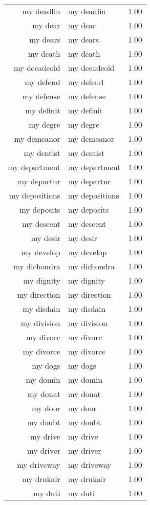 \begin{table}[ht]
\begin{tabular}{rlr}
  my deadlin & my deadlin & 1.00 \\ 
  my dear & my dear & 1.00 \\ 
  my dears & my dears & 1.00 \\ 
  my death & my death & 1.00 \\ 
  my decadeold & my decadeold & 1.00 \\ 
  my defend & my defend & 1.00 \\ 
  my defense & my defense & 1.00 \\ 
  my definit & my definit & 1.00 \\ 
  my degre & my degre & 1.00 \\ 
  my demeanor & my demeanor & 1.00 \\ 
  my dentist & my dentist & 1.00 \\ 
  my department & my department & 1.00 \\ 
  my departur & my departur & 1.00 \\ 
  my depositions & my depositions & 1.00 \\ 
  my deposits & my deposits & 1.00 \\ 
  my descent & my descent & 1.00 \\ 
  my desir & my desir & 1.00 \\ 
  my develop & my develop & 1.00 \\ 
  my dichondra & my dichondra & 1.00 \\ 
  my dignity & my dignity & 1.00 \\ 
  my direction & my direction & 1.00 \\ 
  my disdain & my disdain & 1.00 \\ 
  my division & my division & 1.00 \\ 
  my divorc & my divorc & 1.00 \\ 
  my divorce & my divorce & 1.00 \\ 
  my dogs & my dogs & 1.00 \\ 
  my domin & my domin & 1.00 \\ 
  my donat & my donat & 1.00 \\ 
  my door & my door & 1.00 \\ 
  my doubt & my doubt & 1.00 \\ 
  my drive & my drive & 1.00 \\ 
  my driver & my driver & 1.00 \\ 
  my driveway & my driveway & 1.00 \\ 
  my drukair & my drukair & 1.00 \\ 
  my duti & my duti & 1.00 \\ 

\end{tabular}
\end{table}

